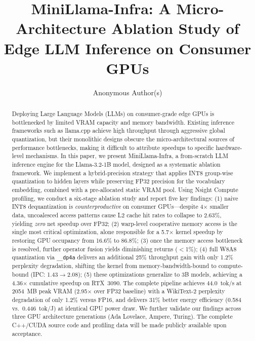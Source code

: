 \documentclass[conference]{IEEEtran}
\begin{document}
\title{MiniLlama-Infra: A Micro-Architecture Ablation Study of Edge LLM Inference on Consumer GPUs}

\author{Anonymous Author(s)}

\maketitle

\begin{abstract}
Deploying Large Language Models (LLMs) on consumer-grade edge GPUs is bottlenecked by limited VRAM capacity and memory bandwidth. Existing inference frameworks such as llama.cpp achieve high throughput through aggressive global quantization, but their monolithic designs obscure the micro-architectural sources of performance bottlenecks, making it difficult to attribute speedups to specific hardware-level mechanisms. In this paper, we present MiniLlama-Infra, a from-scratch LLM inference engine for the Llama-3.2-1B model, designed as a systematic ablation framework. We implement a hybrid-precision strategy that applies INT8 group-wise quantization to hidden layers while preserving FP32 precision for the vocabulary embedding, combined with a pre-allocated static VRAM pool. Using Nsight Compute profiling, we conduct a six-stage ablation study and report five key findings: (1) naive INT8 dequantization is \emph{counterproductive} on consumer GPUs---despite 4$\times$ smaller data, uncoalesced access patterns cause L2 cache hit rates to collapse to 2.63\%, yielding \emph{zero} net speedup over FP32; (2) warp-level cooperative memory access is the single most critical optimization, alone responsible for a 5.7$\times$ kernel speedup by restoring GPU occupancy from 16.6\% to 86.8\%; (3) once the memory access bottleneck is resolved, further operator fusion yields diminishing returns ($<$1\%); (4) full W8A8 quantization via \texttt{\_\_dp4a} delivers an additional 25\% throughput gain with only 1.2\% perplexity degradation, shifting the kernel from memory-bandwidth-bound to compute-bound (IPC: 1.43$\to$2.08); (5) these optimizations generalize to 3B models, achieving a 4.36$\times$ cumulative speedup on RTX~3090. The complete pipeline achieves 44.0~tok/s at 2054~MB peak VRAM (2.95$\times$ over FP32 baseline) with a WikiText-2 perplexity degradation of only 1.2\% versus FP16, and delivers 31\% better energy efficiency (0.584 vs.\ 0.446~tok/J) at identical GPU power draw. We further validate our findings across three GPU architecture generations (Ada Lovelace, Ampere, Turing). The complete C++/CUDA source code and profiling data will be made publicly available upon acceptance.
\end{abstract}
\end{document}

